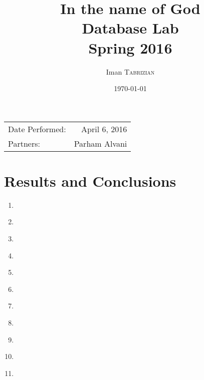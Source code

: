 \documentclass{article}
\title{In the name of God \\ Database Lab \\ Spring 2016} %
\author{Iman \textsc{Tabrizian}} %
\date{\today} %
\begin{document}
\maketitle %

\begin{center}
	\begin{tabular}{l r}
		Date Performed: & April 6, 2016 \\ %
		Partners: & Parham Alvani \\ %
	\end{tabular}
\end{center}



\section{Results and Conclusions}
\begin{enumerate}
	\item
		\inputminted{sql}{src/im-par-1.sql}
	\item
		\inputminted{sql}{src/im-par-2-a.sql}
	\item
		\inputminted{sql}{src/im-par-2-b.sql}
	\item
		\inputminted{sql}{src/im-par-2-c.sql}
	\item
		\inputminted{sql}{src/im-par-3-a.sql}
	\item
		\inputminted{sql}{src/im-par-3-b.sql}
	\item
		\inputminted{sql}{src/im-par-4-a.sql}
	\item
		\inputminted{sql}{src/im-par-4-a-2.sql}
	\item
		\inputminted{sql}{src/im-par-4-b.sql}
	\item
		\inputminted{sql}{src/im-par-4-3.sql}
	\item
		\inputminted{sql}{src/im-par-4-create-log.sql}
\end{enumerate}
\end{document}
